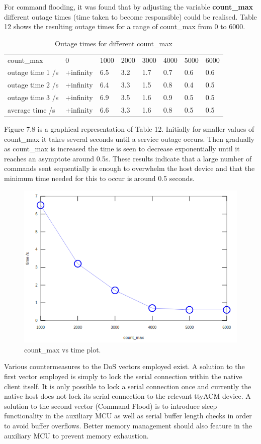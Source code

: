For command flooding, it was found that by adjusting the variable \textbf{count\_max} different outage times (time taken to become responsible) could be realised. Table 12 shows the resulting outage times for a range of count\_max from 0 to 6000.
\begin{table}[H]
\centering
\begin{tabular}{llllllll}
count\_max     & 0         & 1000 & 2000 & 3000 & 4000 & 5000 & 6000 \\
outage time 1 /s & +infinity & 6.5  & 3.2  & 1.7  & 0.7  & 0.6  & 0.6 \\
outage time 2 /s & +infinity & 6.4  & 3.3  & 1.5  & 0.8  & 0.4  & 0.5 \\
outage time 3 /s & +infinity & 6.9  & 3.5  & 1.6  & 0.9  & 0.5  & 0.5\\
average time /s & +infinity & 6.6  & 3.3  & 1.6  & 0.8  & 0.5  & 0.5
\end{tabular}
\caption{Outage times for different count\_max}
\end{table}

Figure 7.8 is a graphical representation of Table 12. Initially for smaller values of count\_max it takes several seconds until a service outage occurs. Then gradually as count\_max is increased the time is seen to decrease exponentially until it reaches an asymptote around 0.5s. These results indicate that a large number of commands sent sequentially is enough to overwhelm the host device and that the minimum time needed for this to occur is around 0.5 seconds.
\begin{figure}[]
\centering
\includegraphics[width=0.75\columnwidth]{Figures/Fig_50.png}
\caption{count\_max vs time plot.}
\label{fig:gantt}
\end{figure}

Various countermeasures to the DoS vectors employed exist. A solution to the first vector employed is simply to lock the serial connection within the native client itself. It is only possible to lock a serial connection once and currently the native host does not lock its serial connection to the relevant ttyACM device. A solution to the second vector (Command Flood) is to introduce sleep functionality in the auxiliary MCU as well as serial buffer length checks in order to avoid buffer overflows. Better memory management should also feature in the auxiliary MCU to prevent memory exhaustion. 

